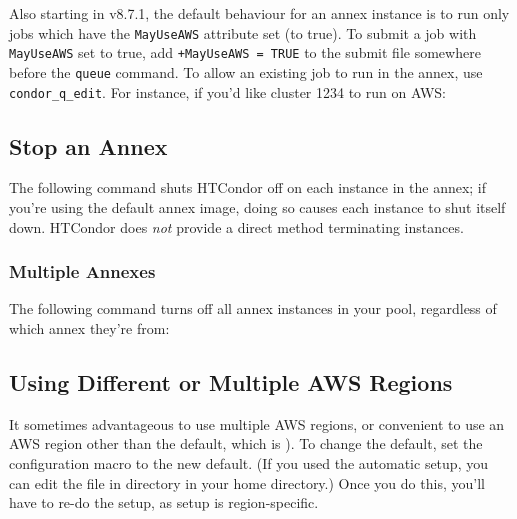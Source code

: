 Also starting in v8.7.1, the default behaviour for an annex instance is to run
only jobs which have the \texttt{MayUseAWS} attribute set (to true).  To
submit a job with \texttt{MayUseAWS} set to true, add
\texttt{+MayUseAWS = TRUE} to the submit file somewhere before the
\texttt{queue} command.  To allow an existing job to run in the annex,
use \texttt{condor\_q\_edit}.  For instance, if you'd like cluster 1234 to run
on AWS:


\subsection{Stop an Annex}

The following command shuts HTCondor off on each instance in the annex; if
you're using the default annex image, doing so causes each instance to shut
itself down.  HTCondor does \emph{not} provide a direct method terminating
 instances.


\subsubsection{Multiple Annexes}

The following command turns off all annex instances in your pool, regardless
of which annex they're from:


\subsection{Using Different or Multiple AWS Regions}

It sometimes advantageous to use multiple AWS regions, or convenient to use
an AWS region other than the default, which is ).  To change
the default, set the configuration macro 
to the new default.  (If you used the  automatic setup, you
can edit the  file in  directory in
your home directory.)  Once you do this, you'll have to re-do the setup,
as setup is region-specific.

